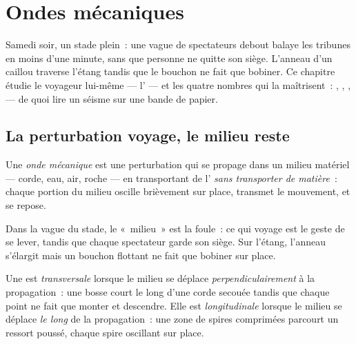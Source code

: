 \chapter{Ondes mécaniques}\label{ch:g12:mechanical-waves}

Samedi soir, un stade plein~: une vague de spectateurs debout
balaye les tribunes en moins d'une minute, sans que personne ne quitte
son siège. L'anneau d'un caillou traverse l'étang tandis que le bouchon
ne fait que bobiner. Ce chapitre étudie le voyageur lui-même ---
l' --- et les quatre nombres qui la maîtrisent~: ,
, ,  --- de quoi lire un séisme
sur une bande de papier.

\section{La perturbation voyage, le milieu reste}

\begin{definition}\label{def:g12:mechanical-waves:wave}
Une \emph{onde mécanique} est une perturbation
qui se propage dans un milieu matériel --- corde, eau, air, roche ---
en transportant de l' \emph{sans transporter de matière}~: chaque
portion du milieu oscille brièvement sur place, transmet le mouvement,
et se repose.
\end{definition}

\begin{example}\label{ex:g12:mechanical-waves:transport}
Dans la vague du stade, le «~milieu~» est la foule~: ce qui voyage
est le geste de se lever, tandis que chaque spectateur garde son siège.
Sur l'étang, l'anneau s'élargit mais un bouchon flottant ne fait que
bobiner sur place.
\end{example}

\begin{definition}\label{def:g12:mechanical-waves:transverse}
Une  est \emph{transversale} lorsque le milieu
se déplace \emph{perpendiculairement} à la propagation~: une bosse
court le long d'une corde secouée tandis que chaque point ne fait que
monter et descendre. Elle est \emph{longitudinale} lorsque le milieu se déplace \emph{le long} de la
propagation~: une zone de spires comprimées parcourt un
ressort poussé, chaque spire oscillant sur place.
\end{definition}

